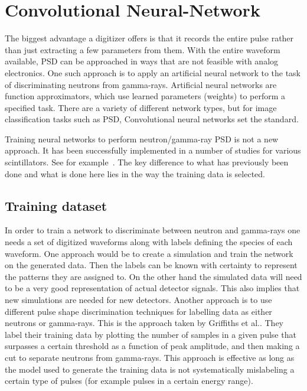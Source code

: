 \documentclass[main.tex]{subfiles}
\begin{document}
\section{Convolutional Neural-Network}\label{sec:cnn}
The biggest advantage a digitizer offers is that it records the entire pulse rather than just extracting a few parameters from them. With the entire waveform available, PSD can be approached in ways that are not feasible with analog electronics. One such approach is to apply an artificial neural network to the task of discriminating neutrons from gamma-rays. 
Artificial neural networks are function approximators, which use learned parameters (weights) to perform a specified task. There are a variety of different network types, but for image classification tasks such as PSD, Convolutional neural networks set the standard. 

Training neural networks to perform neutron/gamma-ray PSD is not a new approach. It has been successfully implemented in a number of studies for various scintillators. See for example~\cite{Griffiths}. The key difference to what has previously been done and what is done here lies in the way the training data is selected.

\subsection{Training dataset}
In order to train a network to discriminate between neutron and gamma-rays one needs a set of digitized waveforms along with labels defining the species of each waveform. One approach would be to create a simulation and train the network on the generated data. Then the labels can be known with certainty to represent the patterns they are assigned to. On the other hand the simulated data will need to be a very good representation of actual detector signals. This also implies that new simulations are needed for new detectors. Another approach is to use different pulse shape discrimination techniques for labelling data as either neutrons or gamma-rays. This is the approach taken by  Griffiths et al.\cite{Griffiths}. They label their training data by plotting the number of samples in a given pulse that surpasses a certain threshold as a function of peak amplitude, and then making a cut to separate neutrons from gamma-rays. This approach is effective as long as the model used to generate the training data is not systematically mislabeling a certain type of pulses (for example pulses in a certain energy range). 
\end{document}
